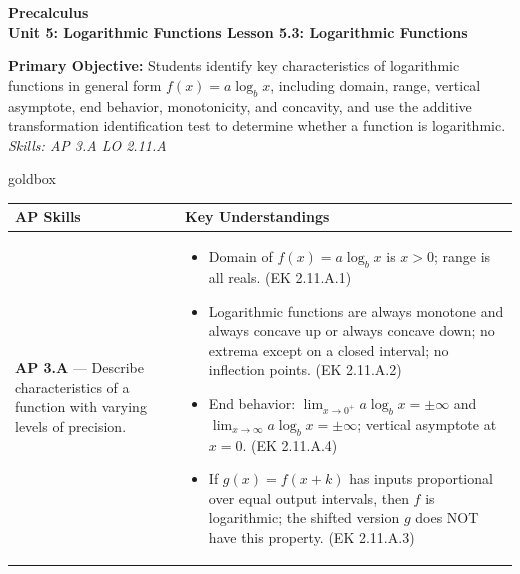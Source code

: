 \documentclass[10pt]{article}
\newcommand{\CourseName}{Precalculus}
\newcommand{\UnitNumberName}{Unit 5: Logarithmic Functions \quad}
\newcommand{\LessonNumberName}{Lesson 5.3: Logarithmic Functions}
\begin{document}
\begin{center}
    {\Large\bfseries \CourseName \\
    {\small\bfseries \UnitNumberName \LessonNumberName}}
\end{center}

\begin{tcolorbox}[colback=sky, colframe=navy, boxrule=0.9pt, arc=2mm,
    left=2mm, right=2mm, top=1.5mm, bottom=1.5mm]
    \textbf{Primary Objective:} Students identify key characteristics of logarithmic functions
    in general form $f(x) = a\log_b x$, including domain, range, vertical asymptote, end
    behavior, monotonicity, and concavity, and use the additive transformation identification
    test to determine whether a function is logarithmic.
    \hfill\textit{\small Skills: AP 3.A \quad LO 2.11.A}
\end{tcolorbox}

\renewcommand{\arraystretch}{1.6}
\begin{skillbox}{goldbox}
\begin{tabularx}{\linewidth}{@{}X X@{}}
\textbf{AP Skills} &
\textbf{Key Understandings} \\
\midrule
\textbf{AP 3.A} --- Describe characteristics of a function with varying levels of precision. &
\begin{itemize}[leftmargin=1.2em,itemsep=2pt,topsep=0pt]
  \item Domain of $f(x) = a\log_b x$ is $x > 0$; range is all reals. (EK 2.11.A.1)
  \item Logarithmic functions are always monotone and always concave up or always concave
        down; no extrema except on a closed interval; no inflection points. (EK 2.11.A.2)
  \item End behavior: $\lim_{x\to 0^+} a\log_b x = \pm\infty$ and
        $\lim_{x\to\infty} a\log_b x = \pm\infty$; vertical asymptote at $x=0$. (EK 2.11.A.4)
  \item If $g(x) = f(x+k)$ has inputs proportional over equal output intervals, then
        $f$ is logarithmic; the shifted version $g$ does NOT have this property. (EK 2.11.A.3)
\end{itemize} \\
\end{tabularx}
\end{skillbox}
\end{document}
